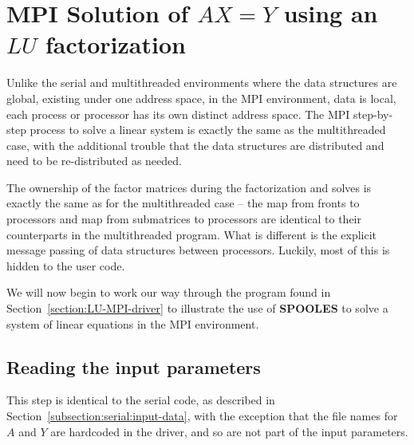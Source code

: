 \par
\vfill \eject
\section{MPI Solution of $A X = Y$ using an $LU$ factorization}
\label{section:LU-MPI}
\par
Unlike the serial and multithreaded environments where the data
structures are global, existing under one address space, 
in the MPI environment, data is local, each process or processor
has its own distinct address space.
The MPI step-by-step process to solve a linear system is exactly
the same as the multithreaded case, with the additional trouble
that the data structures are distributed and need to be
re-distributed as needed.
\par
The ownership of the factor matrices during the factorization and
solves is exactly the same as for the multithreaded case -- the
map from fronts to processors and map from submatrices to
processors are identical to their counterparts in the multithreaded
program.
What is different is the explicit message passing of data
structures between processors.
Luckily, most of this is hidden to the user code.
\par
We will now begin to work our way through the program 
found in Section~\ref{section:LU-MPI-driver}
to illustrate the use of {\bf SPOOLES} to solve a system 
of linear equations in the MPI environment.
\par
\subsection{Reading the input parameters}
\label{subsection:MPI:input-data}
\par
This step is identical to the serial code, as described in
Section~\ref{subsection:serial:input-data}, with the exception
that the file names for $A$ and $Y$ are hardcoded in the driver,
and so are not part of the input parameters.
\par
